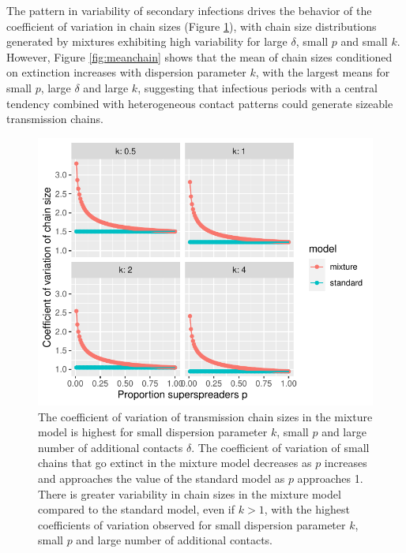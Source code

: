 \documentclass{imammb}
\numberwithin{equation}{section}
\begin{document}
 
 The pattern in variability of secondary infections drives the behavior of the coefficient of variation in chain sizes (Figure \ref{fig:CVchain}), with chain size distributions generated by mixtures exhibiting high variability for large $\delta$,  small $p$ and small $k$. However, Figure \ref{fig:meanchain} shows that the mean of chain sizes conditioned on extinction increases with dispersion parameter $k$, with the largest means for small $p$, large $\delta$ and large $k$, suggesting that infectious periods with a central tendency combined with heterogeneous contact patterns could generate sizeable transmission chains. 
 
 \begin{figure}
    \centering
    \includegraphics{Figure7.pdf}
    \caption{The coefficient of variation of transmission chain sizes in the mixture model is highest for small dispersion parameter $k$, small $p$ and large number of additional contacts $\delta$. The coefficient of variation of small chains that go extinct in the mixture model decreases as $p$ increases and approaches the value of the standard model as $p$ approaches 1. There is greater variability in chain sizes in the mixture model compared to the standard model, even if $k>1$, with the highest coefficients of variation observed for small dispersion parameter $k$, small $p$ and large number of additional contacts. }
    \label{fig:CVchain}
\end{figure}
\end{document}
